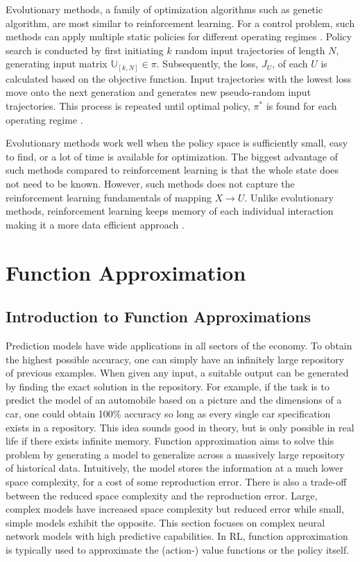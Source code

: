 Evolutionary methods, a family of optimization algorithms such as genetic algorithm, are most similar to reinforcement learning.  For a control problem, such methods can apply multiple static policies for different operating regimes \cite{sutton}.  Policy search is conducted by first initiating $k$ random input trajectories of length $N$, generating input matrix $\mathbb{U}_{[k, N]} \in \pi$.  Subsequently, the loss, $J_U$, of each $U$ is calculated based on the objective function.  Input trajectories with the lowest loss move onto the next generation and generates new pseudo-random input trajectories.  This process is repeated until optimal policy, $\pi^*$ is found for each operating regime \cite{ga_for_control}.

Evolutionary methods work well when the policy space is sufficiently small, easy to find, or a lot of time is available for optimization.  The biggest advantage of such methods compared to reinforcement learning is that the whole state does not need to be known.  However, such methods does not capture the reinforcement learning fundamentals of mapping $X \rightarrow U$.  Unlike evolutionary methods, reinforcement learning keeps memory of each individual interaction making it a more data efficient approach \cite{sutton}.





\section{Function Approximation}
\subsection{Introduction to Function Approximations}
Prediction models have wide applications in all sectors of the economy.  To obtain the highest possible accuracy, one can simply have an infinitely large repository of previous examples.  When given any input, a suitable output can be generated by finding the exact solution in the repository.  For example, if the task is to predict the model of an automobile based on a picture and the dimensions of a car, one could obtain 100\% accuracy so long as every single car specification exists in a repository.  This idea sounds good in theory, but is only possible in real life if there exists infinite memory.  Function approximation aims to solve this problem by generating a model to generalize across a massively large repository of historical data.  Intuitively, the model stores the information at a much lower space complexity, for a cost of some reproduction error.  There is also a trade-off between the reduced space complexity and the reproduction error.  Large, complex models have increased space complexity but reduced error while small, simple models exhibit the opposite.  This section focuses on complex neural network models with high predictive capabilities.  In RL, function approximation is typically used to approximate the (action-) value functions or the policy itself.


